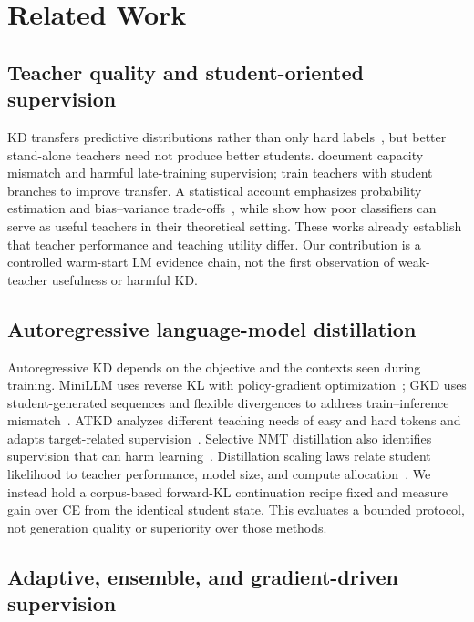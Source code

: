\section{Related Work}\label{sec:related-work}

\subsection{Teacher quality and student-oriented supervision}

KD transfers predictive distributions rather than only hard labels~\citep{hinton2015distilling}, but better stand-alone teachers need not produce better students. \citet{cho2019efficacy} document capacity mismatch and harmful late-training supervision; \citet{park2021friendly} train teachers with student branches to improve transfer. A statistical account emphasizes probability estimation and bias--variance trade-offs~\citep{menon2021statistical}, while \citet{kaplun2022bad} show how poor classifiers can serve as useful teachers in their theoretical setting. These works already establish that teacher performance and teaching utility differ. Our contribution is a controlled warm-start LM evidence chain, not the first observation of weak-teacher usefulness or harmful KD.

\subsection{Autoregressive language-model distillation}

Autoregressive KD depends on the objective and the contexts seen during training. MiniLLM uses reverse KL with policy-gradient optimization~\citep{gu2024minillm}; GKD uses student-generated sequences and flexible divergences to address train--inference mismatch~\citep{agarwal2024gkd}. ATKD analyzes different teaching needs of easy and hard tokens and adapts target-related supervision~\citep{zhong2024atkd}. Selective NMT distillation also identifies supervision that can harm learning~\citep{wang2021selective}. Distillation scaling laws relate student likelihood to teacher performance, model size, and compute allocation~\citep{busbridge2025scaling}. We instead hold a corpus-based forward-KL continuation recipe fixed and measure gain over CE from the identical student state. This evaluates a bounded protocol, not generation quality or superiority over those methods.

\subsection{Adaptive, ensemble, and gradient-driven supervision}

